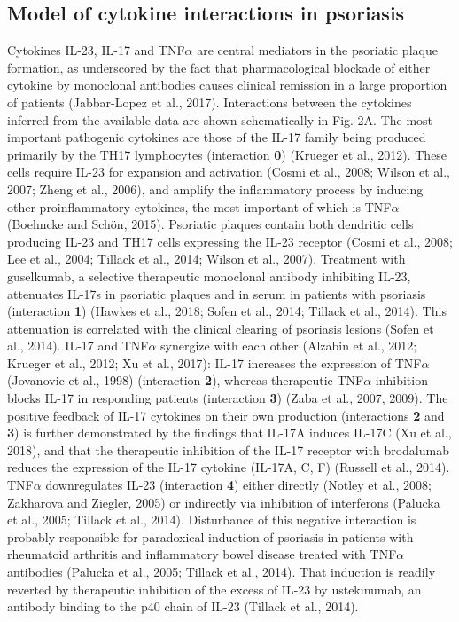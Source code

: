\subsection{Model of cytokine interactions in psoriasis}
Cytokines IL-23, IL-17 and TNF$\alpha$ are central mediators in the psoriatic plaque formation, as underscored by the fact that pharmacological blockade of either cytokine by monoclonal antibodies causes clinical remission in a large proportion of patients (Jabbar-Lopez et al., 2017). Interactions between the cytokines inferred from the available data are shown schematically in Fig. 2A. The most important pathogenic cytokines are those of the IL-17 family being produced primarily by the TH17 lymphocytes (interaction \textbf{0}) (Krueger et al., 2012). These cells require IL-23 for expansion and activation (Cosmi et al., 2008; Wilson et al., 2007; Zheng et al., 2006), and amplify the inflammatory process by inducing other proinflammatory cytokines, the most important of which is TNF$\alpha$ (Boehncke and Schön, 2015). Psoriatic plaques contain both dendritic cells producing IL-23 and TH17 cells expressing the IL-23 receptor (Cosmi et al., 2008; Lee et al., 2004; Tillack et al., 2014; Wilson et al., 2007). Treatment with guselkumab, a selective therapeutic monoclonal antibody inhibiting IL-23, attenuates IL-17s in psoriatic plaques and in serum in patients with psoriasis (interaction \textbf{1}) (Hawkes et al., 2018; Sofen et al., 2014; Tillack et al., 2014). This attenuation is correlated with the clinical clearing of psoriasis lesions (Sofen et al., 2014). IL-17 and TNF$\alpha$ synergize with each other (Alzabin et al., 2012; Krueger et al., 2012; Xu et al., 2017): IL-17 increases the expression of TNF$\alpha$ (Jovanovic et al., 1998) (interaction \textbf{2}), whereas therapeutic TNF$\alpha$ inhibition blocks IL-17 in responding patients (interaction \textbf{3}) (Zaba et al., 2007, 2009). The positive feedback of IL-17 cytokines on their own production (interactions \textbf{2} and \textbf{3}) is further demonstrated by the findings that IL-17A induces IL-17C (Xu et al., 2018), and that the therapeutic inhibition of the IL-17 receptor with brodalumab reduces the expression of the IL-17 cytokine (IL-17A, C, F) (Russell et al., 2014). TNF$\alpha$ downregulates IL-23 (interaction \textbf{4}) either directly (Notley et al., 2008; Zakharova and Ziegler, 2005) or indirectly via inhibition of interferons (Palucka et al., 2005; Tillack et al., 2014). Disturbance of this negative interaction is probably responsible for paradoxical induction of psoriasis in patients with rheumatoid arthritis and inflammatory bowel disease treated with TNF$\alpha$ antibodies (Palucka et al., 2005; Tillack et al., 2014). That induction is readily reverted by therapeutic inhibition of the excess of IL-23 by ustekinumab, an antibody binding to the p40 chain of IL-23 (Tillack et al., 2014). 


